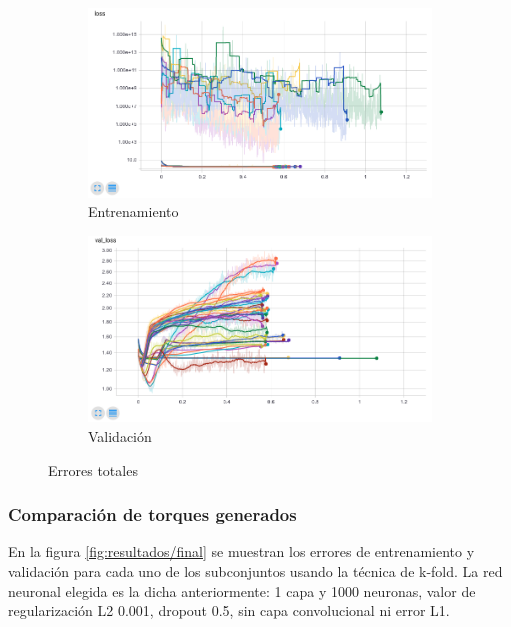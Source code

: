 \begin{figure}[thb]
	\begin{subfigure}[b]{0.45\textwidth}
		\centering
		\includegraphics[width=\linewidth]{imagenes/resultados/loss_all.png}
		\caption{Entrenamiento}
		\label{fig:resultados/loss_all}
	\end{subfigure}
	\begin{subfigure}[b]{0.45\textwidth}
		\centering
		\includegraphics[width=\linewidth]{imagenes/resultados/val_loss_all.png}
		\caption{Validación}
		\label{fig:resultados/val_loss_all}
	\end{subfigure}
	\caption{Errores totales}
	\label{fig:resultados/all}
\end{figure}

\subsubsection{Comparación de torques generados}
En la figura \ref{fig:resultados/final} se muestran los errores de entrenamiento y validación para cada uno de los subconjuntos usando la técnica de k-fold. La red neuronal elegida es la dicha anteriormente: 1 capa y 1000 neuronas, valor de regularización L2 0.001, dropout 0.5, sin capa convolucional ni error L1.

